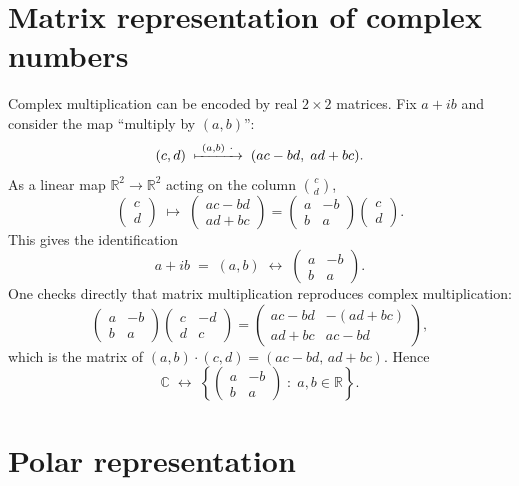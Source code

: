 \documentclass[11pt,openany]{report}
\newcommand{\C}{\mathbb{C}}
\newcommand{\R}{\mathbb{R}}
\newcommand{\set}[1]{\left\{ #1 \right\}}
\begin{document}
\section{Matrix representation of complex numbers}

Complex multiplication can be encoded by real $2\times2$ matrices. Fix $a+ib$ and consider
the map ``multiply by $(a,b)$'':
\[
  (c,d) \;\xmapsto{\ (a,b)\ \cdot\ }\; (ac-bd,\; ad+bc).
\]
As a linear map $\R^2\to\R^2$ acting on the column $\binom{c}{d}$,
\[
  \begin{pmatrix} c \\ d\end{pmatrix}
  \;\longmapsto\;
  \begin{pmatrix} ac-bd \\ ad+bc \end{pmatrix}
  =
  \begin{pmatrix} a & -b \\ b & a \end{pmatrix}
  \begin{pmatrix} c \\ d\end{pmatrix}.
\]
This gives the identification
\[
  a+ib \;=\; (a,b) \;\longleftrightarrow\; \begin{pmatrix} a & -b \\ b & a \end{pmatrix}.
\]
One checks directly that matrix multiplication reproduces complex multiplication:
\[
  \begin{pmatrix} a & -b \\ b & a \end{pmatrix}
  \begin{pmatrix} c & -d \\ d & c \end{pmatrix}
  =
  \begin{pmatrix} ac-bd & -(ad+bc) \\ ad+bc & ac-bd \end{pmatrix},
\]
which is the matrix of $(a,b)\cdot(c,d)=(ac-bd,\,ad+bc)$. Hence
\[
  \C \;\longleftrightarrow\;
  \set{ \begin{pmatrix} a & -b \\ b & a \end{pmatrix} \;:\; a,b\in\R }.
\]

\section{Polar representation}
\end{document}

